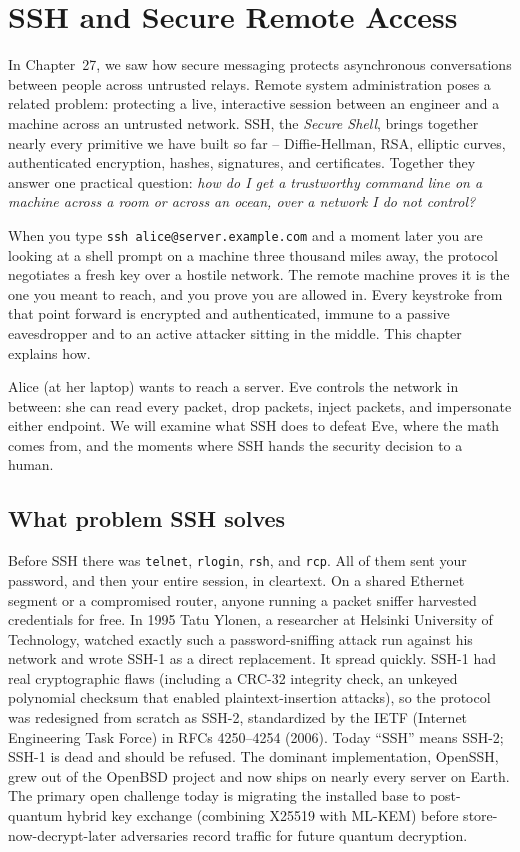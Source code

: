 \chapter{SSH and Secure Remote Access}

In Chapter~27, we saw how secure messaging protects asynchronous conversations between people across untrusted relays. Remote system administration poses a related problem: protecting a live, interactive session between an engineer and a machine across an untrusted network. SSH, the \emph{Secure Shell}, brings together nearly every primitive we have built so far -- Diffie-Hellman, RSA, elliptic curves, authenticated encryption, hashes, signatures, and certificates. Together they answer one practical question: \emph{how do I get a trustworthy command line on a machine across a room or across an ocean, over a network I do not control?}

When you type \texttt{ssh alice@server.example.com} and a moment later you are looking at a shell prompt on a machine three thousand miles away, the protocol negotiates a fresh key over a hostile network. The remote machine proves it is the one you meant to reach, and you prove you are allowed in. Every keystroke from that point forward is encrypted and authenticated, immune to a passive eavesdropper and to an active attacker sitting in the middle. This chapter explains how.

Alice (at her laptop) wants to reach a server. Eve controls the network in between: she can read every packet, drop packets, inject packets, and impersonate either endpoint. We will examine what SSH does to defeat Eve, where the math comes from, and the moments where SSH hands the security decision to a human.

\section{What problem SSH solves}

\begin{historybox}
Before SSH there was \texttt{telnet}, \texttt{rlogin}, \texttt{rsh}, and \texttt{rcp}. All of them sent your password, and then your entire session, in cleartext. On a shared Ethernet segment or a compromised router, anyone running a packet sniffer harvested credentials for free. In 1995 Tatu Ylonen, a researcher at Helsinki University of Technology, watched exactly such a password-sniffing attack run against his network and wrote SSH-1 as a direct replacement. It spread quickly. SSH-1 had real cryptographic flaws (including a CRC-32 integrity check, an unkeyed polynomial checksum that enabled plaintext-insertion attacks), so the protocol was redesigned from scratch as SSH-2, standardized by the IETF (Internet Engineering Task Force) in RFCs 4250--4254 (2006). Today ``SSH'' means SSH-2; SSH-1 is dead and should be refused. The dominant implementation, OpenSSH, grew out of the OpenBSD project and now ships on nearly every server on Earth. The primary open challenge today is migrating the installed base to post-quantum hybrid key exchange (combining X25519 with ML-KEM) before store-now-decrypt-later adversaries record traffic for future quantum decryption.
\end{historybox}

